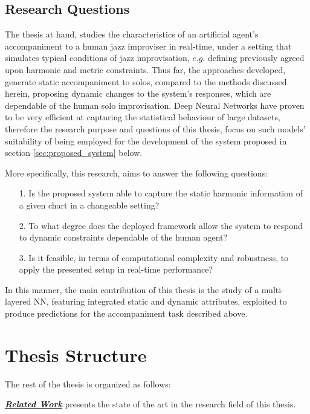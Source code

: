         \subsection{Research Questions} \label{sec:researchQuestions}
        The thesis at hand, studies the characteristics of an artificial agent's accompaniment to a human jazz improviser in real-time, under a setting that simulates typical conditions of jazz improvisation, $e.g.$ defining previously agreed upon harmonic and metric constraints. Thus far, the approaches developed, generate static accompaniment to solos, compared to the methods discussed herein, proposing dynamic changes to the system's responses, which are dependable of the human solo improvisation. Deep Neural Networks have proven to be very efficient at capturing the statistical behaviour of large datasets, therefore the research purpose and questions of this thesis, focus on such models' suitability of being employed for the development of the system proposed in section \ref{sec:proposed_system} below.

        More specifically, this research, aims to answer the following questions:

        \begin{enumerate}
            \item[1.] Is the proposed system able to capture the static harmonic information of a given chart in a changeable setting? 
            \item[2.] To what degree does the deployed framework allow the system to respond to dynamic constraints dependable of the human agent?
            \item[3.] Is it feasible, in terms of computational complexity and robustness, to apply the presented setup in real-time performance?
        \end{enumerate}

        In this manner, the main contribution of this thesis is the study of a multi-layered NN, featuring integrated static and dynamic attributes, exploited to produce predictions for the accompaniment task described above.
        
        

    
    \section{Thesis Structure} 
    The rest of the thesis is organized as follows:

    \hyperref[chapter:related_work]{\textit{\textbf{Related Work}}} presents the state of the art in the research field of this thesis.

